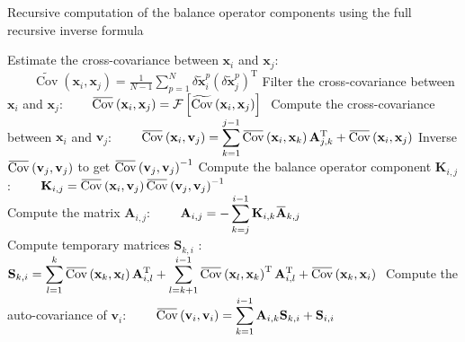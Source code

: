 \documentclass[12pt]{scrartcl}
\newcommand{\overbar}[1]{\mkern 1.5mu\overline{\mkern-1.5mu#1\mkern-1.5mu}\mkern 1.5mu}
\DeclareMathOperator{\Cov}{Cov}
\begin{document}
\begin{algorithm}[!ht]
\caption{Recursive computation of the balance operator components using the full recursive inverse formula \label{algo:full}}
\begin{algorithmic}
\STATE Estimate the cross-covariance between $\mathbf{x}_i$ and $\mathbf{x}_j$:
\STATE $\displaystyle \qquad \widetilde{\Cov}\left(\mathbf{x}_i,\mathbf{x}_j\right) = \frac{1}{N-1} \sum_{p=1}^N \delta \widetilde{\mathbf{x}}^p_i \left(\delta \widetilde{\mathbf{x}}^p_j\right)^\mathrm{T}$
\STATE Filter the cross-covariance between $\mathbf{x}_i$ and $\mathbf{x}_j$:
\STATE $\displaystyle \qquad \overbar{\Cov}\left(\mathbf{x}_i,\mathbf{x}_j\right) = \mathcal{F} \left[\widetilde{\Cov}\left(\mathbf{x}_i,\mathbf{x}_j\right)\right]$
\ENDFOR
\ENDFOR
\STATE $ $
\STATE Compute the cross-covariance between $\mathbf{x}_i$ and $\mathbf{v}_j$:
\STATE $\displaystyle \qquad \overbar{\Cov}\left(\mathbf{x}_i,\mathbf{v}_j\right) = \sum_{k=1}^{j-1} \overbar{\Cov} \left(\mathbf{x}_i,\mathbf{x}_k\right) \mathbf{A}_{j,k}^\mathrm{T} + \overbar{\Cov} \left(\mathbf{x}_i,\mathbf{x}_j\right)$
\STATE Inverse $\overbar{\Cov}\left(\mathbf{v}_j,\mathbf{v}_j\right)$ to get $\overbar{\Cov} \left(\mathbf{v}_j,\mathbf{v}_j\right)^{-1}$
\STATE Compute the balance operator component $\mathbf{K}_{i,j}$:
\STATE $\displaystyle \qquad \mathbf{K}_{i,j} = \overbar{\Cov} \left(\mathbf{x}_i,\mathbf{v}_j\right)\overbar{\Cov} \left(\mathbf{v}_j,\mathbf{v}_j\right)^{-1}$
\ENDFOR
\STATE $  $\\
\STATE Compute the matrix $\mathbf{A}_{i,j}$:
\STATE $\displaystyle \qquad \mathbf{A}_{i,j} = - \sum_{k=j}^{i-1} \mathbf{K}_{i,k} \overbar{\mathbf{A}}_{k,j}$
\ENDFOR
\STATE $  $\\
\STATE Compute temporary matrices $\mathbf{S}_{k,i}$ :
\STATE $\displaystyle \mathbf{S}_{k,i} = \sum_{l=1}^{k} 
 \overbar{\Cov}\left(\mathbf{x}_k,\mathbf{x}_l\right) \mathbf{A}_{i,l}^\mathrm{T} + \sum_{l=k+1}^{i-1} 
 \overbar{\Cov}\left(\mathbf{x}_l,\mathbf{x}_k\right)^\mathrm{T} \mathbf{A}_{i,l}^\mathrm{T} + \overbar{\Cov}\left(\mathbf{x}_k,\mathbf{x}_i\right)$
\ENDFOR
\STATE $ $
\STATE Compute the auto-covariance of $\mathbf{v}_i$:
\STATE $\displaystyle \qquad \overbar{\Cov}\left(\mathbf{v}_i,\mathbf{v}_i\right) = \sum_{k=1}^{i-1} \mathbf{A}_{i,k} \mathbf{S}_{k,i} + \mathbf{S}_{i,i}$
\ENDIF
\ENDFOR
\end{algorithmic}
\end{algorithm}
\end{document}
